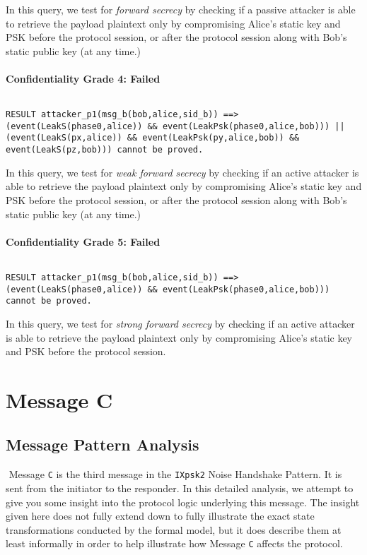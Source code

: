 In this query, we test for \emph{forward secrecy} by checking if a passive attacker is able to retrieve the payload plaintext only by compromising Alice's static key and PSK before the protocol session, or after the protocol session along with Bob's static public key (at any time.)


\paragraph{Confidentiality Grade 4: Failed}$ $
\begin{lstlisting}
RESULT attacker_p1(msg_b(bob,alice,sid_b)) ==> (event(LeakS(phase0,alice)) && event(LeakPsk(phase0,alice,bob))) || (event(LeakS(px,alice)) && event(LeakPsk(py,alice,bob)) && event(LeakS(pz,bob))) cannot be proved.
\end{lstlisting}

In this query, we test for \emph{weak forward secrecy} by checking if an active attacker is able to retrieve the payload plaintext only by compromising Alice's static key and PSK before the protocol session, or after the protocol session along with Bob's static public key (at any time.)


\paragraph{Confidentiality Grade 5: Failed}$ $
\begin{lstlisting}
RESULT attacker_p1(msg_b(bob,alice,sid_b)) ==> (event(LeakS(phase0,alice)) && event(LeakPsk(phase0,alice,bob))) cannot be proved.
\end{lstlisting}

In this query, we test for \emph{strong forward secrecy} by checking if an active attacker is able to retrieve the payload plaintext only by compromising Alice's static key and PSK before the protocol session.


\section{ Message C}

\subsection{Message Pattern Analysis}$ $
Message \texttt{C} is the third message in the \texttt{IXpsk2} Noise Handshake Pattern. It is sent from the initiator to the responder. In this detailed analysis, we attempt to give you some insight into the protocol logic underlying this message. The insight given here does not fully extend down to fully illustrate the exact state transformations conducted by the formal model, but it does describe them at least informally in order to help illustrate how Message \texttt{C} affects the protocol.


